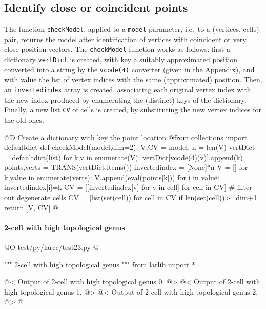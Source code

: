 \documentclass[11pt,oneside]{article}    %
\begin{document}
\subsection{Identify close or coincident points}

The function \texttt{checkModel}, applied to a \texttt{model} parameter, i.e.~to a (vertices, cells)  pair, returns the model after identification of vertices with coincident or very close position vectors.
The \texttt{checkModel} function works as follows: first a dictionary \texttt{vertDict} is created, with key a suitably approximated position converted into a string by the \texttt{vcode(4)} converter (given in the Appendix), and with value the list of vertex indices with the same (approximated) position. Then, an \texttt{invertedindex} array is created, associating each original vertex index with the new index produced by enumerating the (distinct) keys of the dictionary. Finally, a new list \texttt{CV} of cells is created, by substituting the new vertex indices for the old ones. 

@D Create a dictionary with key the point location
@{from collections import defaultdict
def checkModel(model,dim=2):
    V,CV = model; n = len(V)
    vertDict = defaultdict(list)
    for k,v in enumerate(V): vertDict[vcode(4)(v)].append(k) 
    points,verts = TRANS(vertDict.items())
    invertedindex = [None]*n
    V = []
    for k,value in enumerate(verts):
        V.append(eval(points[k]))
        for i in value:
            invertedindex[i]=k    
    CV = [[invertedindex[v] for v in cell] for cell in CV]
    # filter out degenerate cells
    CV = [list(set(cell)) for cell in CV if len(set(cell))>=dim+1]
    return [V, CV]
@}


\paragraph{2-cell with high topological genus}

@O test/py/larcc/test23.py
@{""" 2-cell with high topological genus """
from larlib import *

@< Output of 2-cell with high topological genus 0. @>
@< Output of 2-cell with high topological genus 1. @>
@< Output of 2-cell with high topological genus 2. @>
@}
\end{document}
